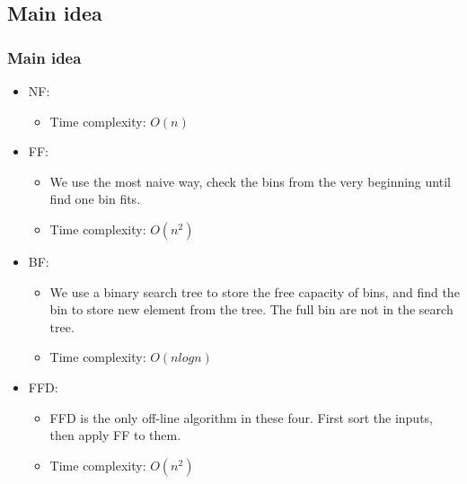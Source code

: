 \documentclass[slidestop,compress,mathserif,brown]{beamer}
\begin{document}
\begin{CJK}{UTF8}{kai}
\subsection{Main idea}
\begin{frame}
\frametitle{Main idea}
\begin{itemize}
	\item NF:
	\begin{itemize}
		\item Time complexity: $O(n)$
	\end{itemize}
	\item FF:
	\begin{itemize}
		\item We use the most naive way, check the bins from the very beginning until find one bin fits.
		\item Time complexity: $O(n^2)$
	\end{itemize}
	\item BF:
	\begin{itemize}
		\item We use a binary search tree to store the free capacity of bins, and find the bin to store new element from the tree. The full bin are not in the search tree.
		\item Time complexity: $O(nlogn)$
	\end{itemize}
	\item FFD:
	\begin{itemize}
		\item FFD is the only off-line algorithm in these four. First sort the inputs, then apply FF to them.
		\item Time complexity: $O(n^2)$
	\end{itemize}
\end{itemize}
\end{frame}


\end{CJK}
\end{document}
